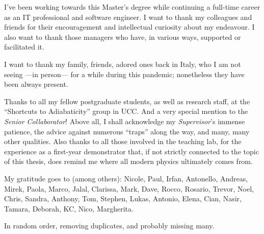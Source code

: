 {

  I've been working towards this Master's degree
  while continuing a full-time career
  as an IT professional and software engineer.
  I want to thank my
  colleagues and friends for their encouragement
  and intellectual curiosity
  about my endeavour.
  I also want to thank those managers
  who have, in various ways, supported or facilitated it.

  I want to thank my family, friends, adored ones back in Italy,
  who I am not seeing ---in person--- for a while during this pandemic;
  nonetheless they have been always present.
  
  Thanks to all my fellow postgraduate students,
  as well as research staff,
  at the ``Shortcuts to Adiabaticity'' group in UCC.
  And a very special mention to the \emph{Senior Collaborator}!
  Above all, I shall acknowledge my \emph{Supervisor}'s immense patience,
  the advice against numerous ``traps'' along the way, and many, many other qualities.
  Also thanks to all those involved in the teaching lab, for the experience as a
  first-year demonstrator that,
  if not strictly connected to the topic of this thesis,
  does remind me where all modern physics ultimately comes from.

  My gratitude goes to (among others):
  Nicole,
  Paul,
  Irfan,
  Antonello,
  Andreas,
  Mirek,
  Paola,
  Marco,
  Jalal,
  Clarissa,
  Mark,
  Dave,
  Rocco,
  Rosario,
  Trevor,
  Noel,
  Chris,
  Sandra,
  Anthony,
  Tom,
  Stephen,
  Lukas,
  Antonio,
  Elena,
  Cian,
  Nasir,
  Tamara,
  Deborah,
  KC,
  Nico,
  Margherita.

  In random order, removing duplicates, and probably missing many.
}
